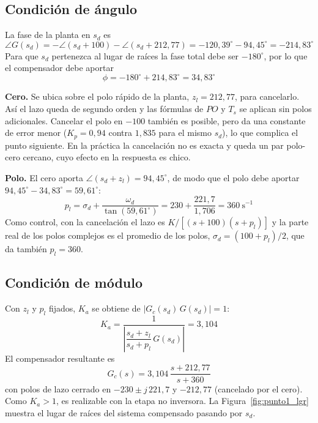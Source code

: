 \documentclass[11pt,a4paper]{article}
\begin{document}
\subsection*{Condición de ángulo}

La fase de la planta en $s_d$ es
\begin{equation}
    \angle G(s_d) = -\angle(s_d + 100) - \angle(s_d + 212{,}77) = -120{,}39^\circ - 94{,}45^\circ = -214{,}83^\circ
\end{equation}
Para que $s_d$ pertenezca al lugar de raíces la fase total debe ser $-180^\circ$, por lo que el compensador debe aportar
\begin{equation}
    \phi = -180^\circ + 214{,}83^\circ = 34{,}83^\circ
\end{equation}

\textbf{Cero.} Se ubica sobre el polo rápido de la planta, $z_l = 212{,}77$, para cancelarlo. Así el lazo queda de segundo orden y las fórmulas de $PO$ y $T_s$ se aplican sin polos adicionales. Cancelar el polo en $-100$ también es posible, pero da una constante de error menor ($K_p = 0{,}94$ contra $1{,}835$ para el mismo $s_d$), lo que complica el punto siguiente. En la práctica la cancelación no es exacta y queda un par polo-cero cercano, cuyo efecto en la respuesta es chico.

\textbf{Polo.} El cero aporta $\angle(s_d + z_l) = 94{,}45^\circ$, de modo que el polo debe aportar $94{,}45^\circ - 34{,}83^\circ = 59{,}61^\circ$:
\begin{equation}
    p_l = \sigma_d + \frac{\omega_d}{\tan(59{,}61^\circ)} = 230 + \frac{221{,}7}{1{,}706} = 360\ \text{s}^{-1}
\end{equation}
Como control, con la cancelación el lazo es $K/[(s+100)(s+p_l)]$ y la parte real de los polos complejos es el promedio de los polos, $\sigma_d = (100 + p_l)/2$, que da también $p_l = 360$.

\subsection*{Condición de módulo}

Con $z_l$ y $p_l$ fijados, $K_a$ se obtiene de $|G_c(s_d)\,G(s_d)| = 1$:
\begin{equation}
    K_a = \frac{1}{\left|\dfrac{s_d + z_l}{s_d + p_l}\, G(s_d)\right|} = 3{,}104
\end{equation}
El compensador resultante es
\begin{equation}
    G_c(s) = 3{,}104\,\frac{s + 212{,}77}{s + 360}
\end{equation}
con polos de lazo cerrado en $-230 \pm j\,221{,}7$ y $-212{,}77$ (cancelado por el cero). Como $K_a > 1$, es realizable con la etapa no inversora. La Figura~\ref{fig:punto1_lgr} muestra el lugar de raíces del sistema compensado pasando por $s_d$.
\end{document}

